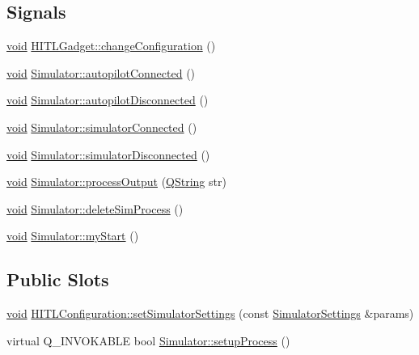 \subsection*{\-Signals}
\begin{DoxyCompactItemize}
\item 
\hyperlink{group___u_a_v_objects_plugin_ga444cf2ff3f0ecbe028adce838d373f5c}{void} \hyperlink{group___h_i_t_l_plugin_ga13e1705f62c6f94853cd64d477b213ef}{\-H\-I\-T\-L\-Gadget\-::change\-Configuration} ()
\item 
\hyperlink{group___u_a_v_objects_plugin_ga444cf2ff3f0ecbe028adce838d373f5c}{void} \hyperlink{group___h_i_t_l_plugin_gac7a4b06b939b52699df392d65a575285}{\-Simulator\-::autopilot\-Connected} ()
\item 
\hyperlink{group___u_a_v_objects_plugin_ga444cf2ff3f0ecbe028adce838d373f5c}{void} \hyperlink{group___h_i_t_l_plugin_ga24f5c82338e62ddaa39f3ea0624f71da}{\-Simulator\-::autopilot\-Disconnected} ()
\item 
\hyperlink{group___u_a_v_objects_plugin_ga444cf2ff3f0ecbe028adce838d373f5c}{void} \hyperlink{group___h_i_t_l_plugin_gaa228d07fc331cb9526ea7e35657c762c}{\-Simulator\-::simulator\-Connected} ()
\item 
\hyperlink{group___u_a_v_objects_plugin_ga444cf2ff3f0ecbe028adce838d373f5c}{void} \hyperlink{group___h_i_t_l_plugin_gad742612caa0cecd4258bd9bdccf38336}{\-Simulator\-::simulator\-Disconnected} ()
\item 
\hyperlink{group___u_a_v_objects_plugin_ga444cf2ff3f0ecbe028adce838d373f5c}{void} \hyperlink{group___h_i_t_l_plugin_ga2442aac38c69150f1089c874f766793e}{\-Simulator\-::process\-Output} (\hyperlink{group___u_a_v_objects_plugin_gab9d252f49c333c94a72f97ce3105a32d}{\-Q\-String} str)
\item 
\hyperlink{group___u_a_v_objects_plugin_ga444cf2ff3f0ecbe028adce838d373f5c}{void} \hyperlink{group___h_i_t_l_plugin_ga04206cd250313cf8c8e4db8a19f88479}{\-Simulator\-::delete\-Sim\-Process} ()
\item 
\hyperlink{group___u_a_v_objects_plugin_ga444cf2ff3f0ecbe028adce838d373f5c}{void} \hyperlink{group___h_i_t_l_plugin_gaf7e8415c98faa84030b51013ef49fa4e}{\-Simulator\-::my\-Start} ()
\end{DoxyCompactItemize}
\subsection*{\-Public \-Slots}
\begin{DoxyCompactItemize}
\item 
\hyperlink{group___u_a_v_objects_plugin_ga444cf2ff3f0ecbe028adce838d373f5c}{void} \hyperlink{group___h_i_t_l_plugin_gacd597e5682d8dbe29504ed7c45245695}{\-H\-I\-T\-L\-Configuration\-::set\-Simulator\-Settings} (const \hyperlink{group___h_i_t_l_plugin_ga052199f1328d3002bce3e45345aa7f4e}{\-Simulator\-Settings} \&params)
\item 
virtual \-Q\-\_\-\-I\-N\-V\-O\-K\-A\-B\-L\-E bool \hyperlink{group___h_i_t_l_plugin_ga25516220ab21d874ae00dd9a21c3e313}{\-Simulator\-::setup\-Process} ()
\end{DoxyCompactItemize}
